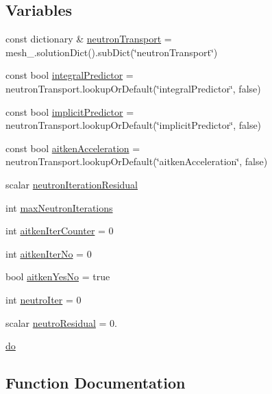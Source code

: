 \subsection*{Variables}
\begin{DoxyCompactItemize}
\item 
const dictionary \& \hyperlink{solveNeutronicsSP3_8H_ac82f3800c6fe7f00c65fbf04d3c1050d}{neutron\+Transport} = mesh\+\_\+.\+solution\+Dict().sub\+Dict(\char`\"{}neutron\+Transport\char`\"{})
\item 
const bool \hyperlink{solveNeutronicsSP3_8H_a47288f41defba643691d6ea37cc5cf2c}{integral\+Predictor} = neutron\+Transport.\+lookup\+Or\+Default(\char`\"{}integral\+Predictor\char`\"{}, false)
\item 
const bool \hyperlink{solveNeutronicsSP3_8H_a46db48a7bd00bc40295bd4cf91143649}{implicit\+Predictor} = neutron\+Transport.\+lookup\+Or\+Default(\char`\"{}implicit\+Predictor\char`\"{}, false)
\item 
const bool \hyperlink{solveNeutronicsSP3_8H_a94a477396c84cabf64ee11e6cc47bc86}{aitken\+Acceleration} = neutron\+Transport.\+lookup\+Or\+Default(\char`\"{}aitken\+Acceleration\char`\"{}, false)
\item 
scalar \hyperlink{solveNeutronicsSP3_8H_a868e32a0d29170b5c556eabe69917730}{neutron\+Iteration\+Residual}
\item 
int \hyperlink{solveNeutronicsSP3_8H_aeeb27a033c3d21cdfe4cc47565bc21a2}{max\+Neutron\+Iterations}
\item 
int \hyperlink{solveNeutronicsSP3_8H_a99558413abb34d76245c07185d7117d4}{aitken\+Iter\+Counter} = 0
\item 
int \hyperlink{solveNeutronicsSP3_8H_a0a1c3011c74baf349d41384de3b18ee3}{aitken\+Iter\+No} = 0
\item 
bool \hyperlink{solveNeutronicsSP3_8H_a54b3011be8f08fc82447c253fd5ddfef}{aitken\+Yes\+No} = true
\item 
int \hyperlink{solveNeutronicsSP3_8H_a5ea48e0170faff29dfdd3cbba330d51d}{neutro\+Iter} = 0
\item 
scalar \hyperlink{solveNeutronicsSP3_8H_a2a3baa00ecfd5a47c6f6ba475a66d2c6}{neutro\+Residual} = 0.
\item 
\hyperlink{solveNeutronicsSP3_8H_a721c6ff80a6d3e4ad4ffa52a04c60085}{do}
\end{DoxyCompactItemize}


\subsection{Function Documentation}
\mbox{\label{solveNeutronicsSP3_8H_a12046a30b04bbfb1f05948a712e65123}} 
